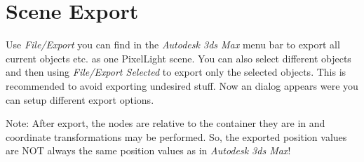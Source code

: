 \chapter{Scene Export}
Use \emph{File/Export} you can find in the \emph{Autodesk 3ds Max} menu bar to export all current objects etc. as one PixelLight scene. You can also select different objects and then using \emph{File/Export Selected} to export only the selected objects. This is recommended to avoid exporting undesired stuff. Now an dialog appears were you can setup different export options.

Note: After export, the nodes are relative to the container they are in and coordinate transformations may be performed. So, the exported position values are NOT always the same position values as in \emph{Autodesk 3ds Max}!
